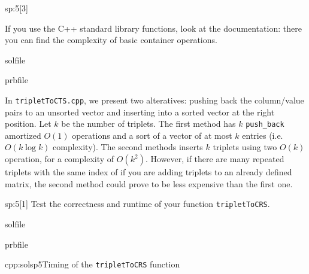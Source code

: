 \begin{samproblem}
\begin{subproblem}{sp:5}[3]
  \begin{samhint}
   If you use the C++ standard library functions, look at the documentation: there you can find the complexity of basic container operations.
  \end{samhint}
  \begin{samwriteprbpart}{solfile}
    \begin{writeverbatim}{prbfile}
      \begin{samsolution}
  		In \texttt{tripletToCTS.cpp}, we present two alteratives: pushing back the column/value pairs to an unsorted vector and inserting into a sorted vector at the right position.
  		Let $k$ be the number of triplets. The first method has $k$ \texttt{push\_back} amortized $O(1)$ operations and a	sort of a vector of at most $k$ entries (i.e. $O(k \log k)$ complexity). 
			The second methods inserts $k$ triplets using two $O(k)$  operation, for a complexity of $O(k^2)$.
  		However, if there are many repeated triplets with the same index of if you are adding triplets to an already defined matrix, the second method could prove to be less expensive than the first one.
      \end{samsolution}
    \end{writeverbatim}
  \end{samwriteprbpart}
\end{subproblem}

\begin{subproblem}{sp:5}[1]
  Test the correctness and runtime of your function \verb|tripletToCRS|.
\end{subproblem}

  \begin{samwriteprbpart}{solfile}
    \begin{writeverbatim}{prbfile}
      \begin{samsolution}
		 	\begin{samcode}[C++-code]{cpp:solsp5}{Timing of the \texttt{tripletToCRS} function}
			\end{samcode}	
     \end{samsolution}
    \end{writeverbatim}
  \end{samwriteprbpart}

\end{samproblem}
 
